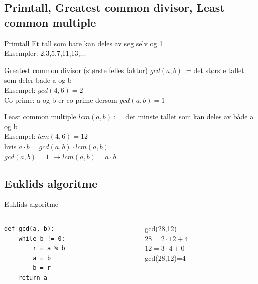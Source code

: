 \subsection*{Primtall, Greatest common divisor, Least common multiple}
\begin{frame}
\begin{block}{Primtall}
Et tall som bare kan deles av seg selv og 1\\
Eksempler: 2,3,5,7,11,13,...
\end{block}
\pause
\begin{block}{Greatest common divisor (største felles faktor)}
$gcd(a,b) := $det største tallet som deler både a og b\\
Eksempel: $gcd(4,6)=2$\\
Co-prime: a og b er co-prime dersom $gcd(a,b)=1$
\end{block}
\pause
\begin{block}{Least common multiple}
$lcm(a,b) := $ det minste tallet som kan deles av både a og b\\
Eksempel: $lcm(4,6)=12$\\
hvis $a\cdot b=gcd(a,b)\cdot lcm(a,b)$\\
$gcd(a,b) = 1$ $\rightarrow lcm(a,b) = a\cdot b$
\end{block}
\end{frame}

\subsection*{Euklids algoritme}
\begin{frame}[fragile]{Euklids algoritme}
\begin{columns}
    \begin{column}{0.45\textwidth}
\begin{verbatim}
def gcd(a, b):
    while b != 0:
        r = a % b
        a = b
        b = r
    return a
\end{verbatim}
 	\end{column}
 	\pause
    \begin{column}{0.45\textwidth}
    \begin{center}
       gcd(28,12)\\
       
    $28=2\cdot 12+4$\\
    $12=3\cdot 4+0$\\
    
    gcd(28,12)=4 
    \end{center}
 	\end{column}
\end{columns}


\end{frame}

